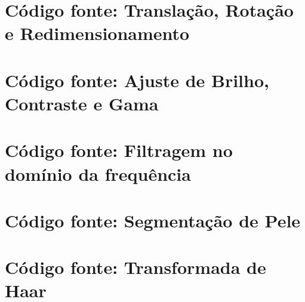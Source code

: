 \documentclass[
	article,			%
	11pt,				%
	oneside,			%
	a4paper,			%
	english,			%
	brazil,				%
	sumario=tradicional
	]{abntex2}
\newcommand{\matlabCodePath}{/home/clifte/git/Mestrado/Matlab/}
\begin{document}

\begin{apendicesenv} 

\chapter{Código fonte: Translação, Rotação e Redimensionamento}
\label{apend:transRotRed}

	
 	\lstset{extendedchars=true,inputencoding=utf8/latin1}
 	



\chapter{Código fonte: Ajuste de Brilho, Contraste e Gama}
\label{apend:contBriGama}

\lstset{extendedchars=true,inputencoding=utf8/latin1}








\chapter{Código fonte: Filtragem no domínio da frequência}
\label{apend:filtragemCod}
\lstset{extendedchars=true,inputencoding=utf8/latin1}


\chapter{Código fonte: Segmentação de Pele}
\label{apend:skinSegment}
\lstset{extendedchars=true,inputencoding=utf8/latin1}


\chapter{Código fonte: Transformada de Haar}
\label{apend:HaarCode}
\lstset{extendedchars=true,inputencoding=utf8/latin1}



\end{apendicesenv}
\end{document}
